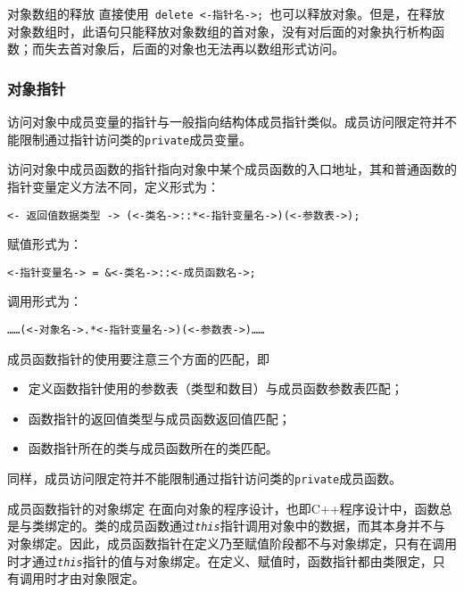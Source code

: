 \documentclass[10pt, a4paper, oneside, fontset=none]{ctexart}
\theoremstyle{plain}
\theoremstyle{definition}
\newcommand{\zhu}[2][]{\begin{note}{#1}\xiu #2\end{note}}
\begin{document}
\zhu[对象数组的释放]{
	直接使用~\lstinline|delete <-指针名->;|~也可以释放对象。但是，在释放对象数组时，此语句只能释放对象数组的首对象，没有对后面的对象执行析构函数；而失去首对象后，后面的对象也无法再以数组形式访问。
}

\subsubsection{对象指针}

访问对象中成员变量的指针与一般指向结构体成员指针类似。成员访问限定符并不能限制通过指针访问类的\texttt{private}成员变量。

访问对象中成员函数的指针指向对象中某个成员函数的入口地址，其和普通函数的指针变量定义方法不同，定义形式为：
\begin{lstlisting}[style=intro]
	<- 返回值数据类型 -> (<-类名->::*<-指针变量名->)(<-参数表->);
\end{lstlisting}
赋值形式为：
\begin{lstlisting}[style=intro]
	<-指针变量名-> = &<-类名->::<-成员函数名->;
\end{lstlisting}
调用形式为：
\begin{lstlisting}[style=intro]
	……(<-对象名->.*<-指针变量名->)(<-参数表->)……
\end{lstlisting}

成员函数指针的使用要注意三个方面的匹配，即
\begin{itemize}
	\item 定义函数指针使用的参数表（类型和数目）与成员函数参数表匹配；
	\item 函数指针的返回值类型与成员函数返回值匹配；
	\item 函数指针所在的类与成员函数所在的类匹配。
\end{itemize}
同样，成员访问限定符并不能限制通过指针访问类的\texttt{private}成员函数。

\zhu[成员函数指针的对象绑定]{
	在面向对象的程序设计，也即C++程序设计中，函数总是与类绑定的。类的成员函数通过\texttt{\textit{this}}指针调用对象中的数据，而其本身并不与对象绑定。因此，成员函数指针在定义乃至赋值阶段都不与对象绑定，只有在调用时才通过\texttt{\textit{this}}指针的值与对象绑定。在定义、赋值时，函数指针都由类限定，只有调用时才由对象限定。
}
\end{document}
